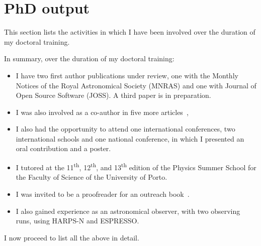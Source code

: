 \chapter{PhD output}\label{app:phd_output}

This section lists the activities in which I have been involved over the duration of my doctoral training.

In summary, over the duration of my doctoral training:
\begin{itemize}
    \item I have two first author publications under review, one with the Monthly Notices of the Royal Astronomical Society (MNRAS) and one with Journal of Open Source Software (JOSS). A third paper is in preparation. 
    \item I was also involved as a co-author in five more articles~\citep{figueira_radial_2016, barros_precise_2017, santerne_earthsized_2018, lillo-box_troy_2018, ulmer-moll_telluric_2018},
    \item I also had the opportunity to attend one international conferences, two international schools and one national conference, in which I presented an oral contribution and a  poster.
    \item I tutored at the 11\textsuperscript{th}, 12\textsuperscript{th}, and 13\textsuperscript{th} edition of the Physics Summer School for the Faculty of Science of the University of Porto.
    \item I was invited to be a proofreader for an outreach book~\citet{figueira_astro_2015}.
    \item I also gained experience as an astronomical observer, with two observing runs, using {HARPS-N} and {ESPRESSO}.
\end{itemize}

I now proceed to list all the above in detail.

\clearpage


\clearpage


\clearpage


\clearpage


\clearpage


\clearpage


\clearpage
